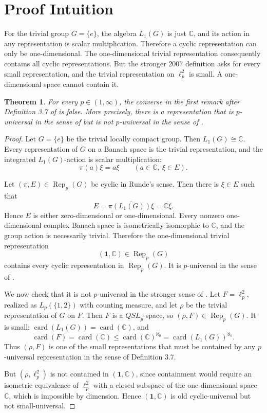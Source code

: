 \documentclass[11pt]{article}
\newtheorem{theorem}{Theorem}
\newcommand{\QSL}{\mathit{QSL}}
\newcommand{\Rep}{\operatorname{Rep}}
\newcommand{\card}{\operatorname{card}}
\begin{document}
\section*{Proof Intuition}

For the trivial group \(G=\{e\}\), the algebra \(L_1(G)\) is just
\(\mathbb C\), and its action in any representation is scalar
multiplication.  Therefore a cyclic representation can only be
one-dimensional.  The one-dimensional trivial representation consequently
contains all cyclic representations.  But the stronger 2007 definition asks
for every small representation, and the trivial representation on
\(\ell_p^2\) is small.  A one-dimensional space cannot contain it.

\begin{theorem}
For every \(p\in(1,\infty)\), the converse in the first remark after
Definition 3.7 of \cite{NR2007} is false.  More precisely, there is a
representation that is \(p\)-universal in the sense of
\cite[Definition 4.5]{Runde2004} but is not \(p\)-universal in the sense of
\cite[Definition 3.7]{NR2007}.
\end{theorem}

\begin{proof}
Let \(G=\{e\}\) be the trivial locally compact group.  Then
\(L_1(G)\cong\mathbb C\).  Every representation of \(G\) on a Banach space is
the trivial representation, and the integrated \(L_1(G)\)-action is scalar
multiplication:
\[
  \pi(a)\xi = a\xi \qquad (a\in\mathbb C,\ \xi\in E).
\]

Let \((\pi,E)\in\Rep_p(G)\) be cyclic in Runde's sense.  Then there is
\(\xi\in E\) such that
\[
  E=\overline{\pi(L_1(G))\xi}=\overline{\mathbb C\xi}.
\]
Hence \(E\) is either zero-dimensional or one-dimensional.  Every nonzero
one-dimensional complex Banach space is isometrically isomorphic to
\(\mathbb C\), and the group action is necessarily trivial.  Therefore the
one-dimensional trivial representation
\[
  (\mathbf 1,\mathbb C)\in\Rep_p(G)
\]
contains every cyclic representation in \(\Rep_p(G)\).  It is
\(p\)-universal in the sense of \cite[Definition 4.5]{Runde2004}.

We now check that it is not \(p\)-universal in the stronger sense of
\cite[Definition 3.7]{NR2007}.  Let \(F=\ell_p^2\), realized as
\(L_p(\{1,2\})\) with counting measure, and let \(\rho\) be the trivial
representation of \(G\) on \(F\).  Then \(F\) is a \(\QSL_p\)-space, so
\((\rho,F)\in\Rep_p(G)\).  It is small: \(\card(L_1(G))=\card(\mathbb C)\),
and
\[
  \card(F)=\card(\mathbb C)\leq \card(\mathbb C)^{\aleph_0}
  = \card(L_1(G))^{\aleph_0}.
\]
Thus \((\rho,F)\) is one of the small representations that must be contained
by any \(p\)-universal representation in the sense of Definition 3.7.

But \((\rho,\ell_p^2)\) is not contained in \((\mathbf 1,\mathbb C)\), since
containment would require an isometric equivalence of \(\ell_p^2\) with a
closed subspace of the one-dimensional space \(\mathbb C\), which is
impossible by dimension.  Hence \((\mathbf 1,\mathbb C)\) is old
cyclic-universal but not small-universal.
\end{proof}
\end{document}
